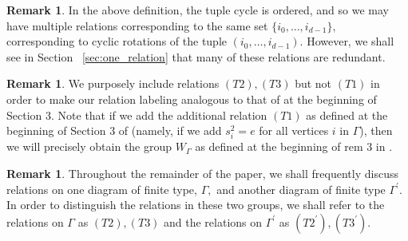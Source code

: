 \documentclass[11pt]{amsart}
\theoremstyle{definition}
\newtheorem{rem}[thm]{Remark}
\begin{document}
\begin{rem}
In the above definition, the tuple cycle is ordered, and so we may have multiple relations corresponding to the same set $\{i_0,\ldots, i_{d-1}\},$ corresponding to cyclic rotations of the tuple $(i_0,\ldots, i_{d-1}).$ However, we shall see in Section ~\ref{sec:one_relation} that many of these relations are redundant.
\end{rem}

\begin{rem}
We purposely include relations $(T2),(T3)$ but not $(T1)$ in order to make our relation labeling analogous to that of \cite{BM13} at the beginning of Section 3. Note that if we add the additional relation $(T1)$ as defined at the beginning of Section 3 of \cite{BM13} (namely, if we add $s_i^2 = e$ for all vertices $i$ in $\Gamma$), then we will precisely obtain the group $W_\Gamma$ as defined at the beginning of rem 3 in \cite{BM13}.
\end{rem}

\begin{rem}
Throughout the remainder of the paper, we shall frequently discuss relations on one diagram of finite type, $\Gamma,$ and another diagram of finite type $\Gamma^\prime.$ In order to distinguish the relations in these two groups, we shall refer to the relations on $\Gamma$ as $(T2),(T3)$ and the relations on $\Gamma^\prime$ as $(T2^\prime),(T3^\prime).$
\end{rem}
\end{document}
